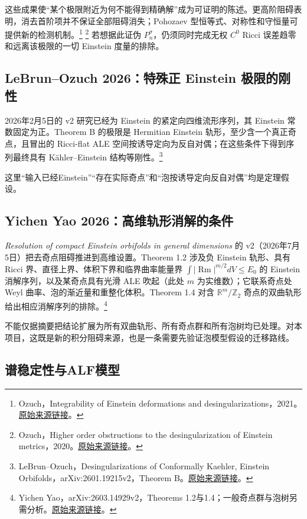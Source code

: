 \documentclass[11pt,a4paper]{article}
\theoremstyle{definition}
\newcommand{\Rm}{\operatorname{Rm}}
\newcommand{\src}[3]{\footnote{\raggedright #1，#2。\href{#3}{原始来源链接}。}}
\begin{document}
这些成果使“某个极限附近为何不能得到精确解”成为可证明的陈述。更高阶阻碍表明，消去首阶项并不保证全部阻碍消失；Pohozaev 型恒等式、对称性和守恒量可提供新的检测机制。\src{Ozuch}{Integrability of Einstein deformations and desingularizations，2021}{https://arxiv.org/abs/2105.13193}
\src{Ozuch}{Higher order obstructions to the desingularization of Einstein metrics，2020}{https://arxiv.org/abs/2012.13316}
若想据此证伪 $P_n^\sigma$，仍须同时完成无权 $C^0$ Ricci 误差趋零和远离该极限的一切 Einstein 度量的排除。

\subsection{LeBrun--Ozuch 2026：特殊正 Einstein 极限的刚性}

2026年2月5日的 v2 研究已经为 Einstein 的紧定向四维流形序列，其 Einstein 常数固定为正。Theorem B 的极限是 Hermitian Einstein 轨形，至少含一个真正奇点，且冒出的 Ricci-flat ALE 空间按诱导定向为反自对偶；在这些条件下得到序列最终具有 Kähler--Einstein 结构等刚性。\src{LeBrun--Ozuch}{Desingularizations of Conformally Kaehler, Einstein Orbifolds，arXiv:2601.19215v2，Theorem B}{https://arxiv.org/html/2601.19215v2}

这里“输入已经Einstein”“存在实际奇点”和“泡按诱导定向反自对偶”均是定理假设。

\subsection{Yichen Yao 2026：高维轨形消解的条件}

\emph{Resolution of compact Einstein orbifolds in general dimensions} 的 v2（2026年7月5日）把去奇点阻碍推进到高维设置。Theorem 1.2 涉及负 Einstein 轨形、具有 Ricci 界、直径上界、体积下界和临界曲率能量界 $\int|\Rm|^{m/2}dV\le E_0$ 的 Einstein 消解序列，以及某奇点具有光滑 ALE 吹起（此处 $m$ 为实维数）；它联系奇点处 Weyl 曲率、泡的渐近量和重整化体积。Theorem 1.4 对含 $\mathbb R^m/\mathbb Z_2$ 奇点的双曲轨形给出相应消解序列的排除。\src{Yichen Yao}{arXiv:2603.14929v2，Theorems 1.2与1.4；一般奇点群与泡树另需分析}{https://arxiv.org/html/2603.14929v2}

不能仅据摘要把结论扩展为所有双曲轨形、所有奇点群和所有泡树均已处理。对本项目，这既是新的积分阻碍来源，也是一条需要先验证泡模型假设的迁移路线。

\subsection{谱稳定性与ALF模型}
\end{document}
